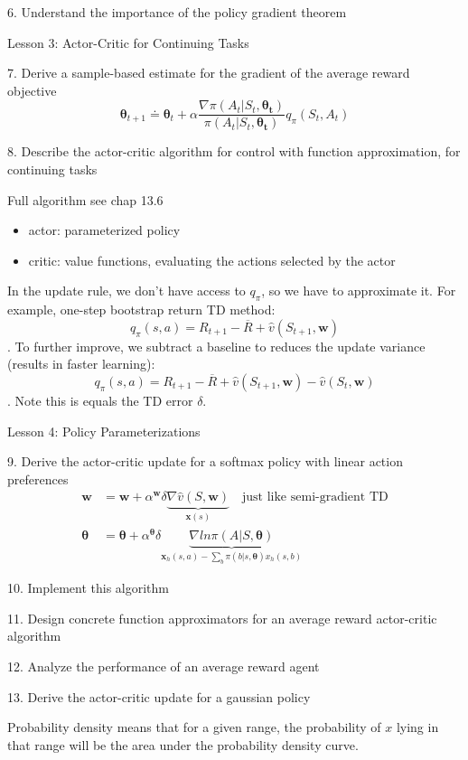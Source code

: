 \documentclass[sutton_barto_notes.tex]{subfiles}
\begin{document}
6. Understand the importance of the policy gradient theorem 

Lesson 3: Actor-Critic for Continuing Tasks 

7. Derive a sample-based estimate for the gradient of the average reward objective 
$$\bm{\theta}_{t+1} \doteq \bm{\theta}_t + \alpha \frac{\nabla \pi(A_t | S_t, \bm{\theta_t})}{\pi(A_t | S_t, \bm{\theta_t})}q_\pi(S_t,A_t)$$

8. Describe the actor-critic algorithm for control with function approximation, for continuing tasks 

Full algorithm see chap 13.6

\begin{itemize}
\item actor: parameterized policy
\item critic: value functions, evaluating the actions selected by the actor
\end{itemize}
In the update rule, we don't have access to $q_\pi$, so we have to approximate it. For example, one-step bootstrap return TD method:
$$q_\pi(s,a) = R_{t+1} - \overline{R}+\hat{v}(S_{t+1}, \bm{w}) $$.
To further improve, we subtract a baseline to reduces the update variance (results in faster learning):
$$q_\pi(s,a) = R_{t+1} - \overline{R}+\hat{v}(S_{t+1}, \bm{w}) - \hat{v}(S_t, \bm{w}) $$.
Note this is equals the TD error $\delta$.

Lesson 4: Policy Parameterizations 

9. Derive the actor-critic update for a softmax policy with linear action preferences 
\begin{align*}
\bm{w} &= \bm{w} + \alpha^{\bm{w}} \delta \underbrace{\nabla\hat{v}(S,\bm{w})}_{\bm{x}(s)} \quad \text{just like semi-gradient TD}\\
\bm{\theta} &= \bm{\theta} + \alpha^{\bm{\theta}}\delta \underbrace{\nabla ln \pi(A|S,\bm{\theta})}_{ \bm{x}_h(s,a) - \sum_b \pi(b|s, \bm{\theta})x_h(s,b) }
\end{align*}

10. Implement this algorithm 

11. Design concrete function approximators for an average reward actor-critic algorithm 

12. Analyze the performance of an average reward agent 

13. Derive the actor-critic update for a gaussian policy 

Probability density means that for a given range, the probability of $x$ lying in that range will be the area under the probability density curve.
\end{document}
